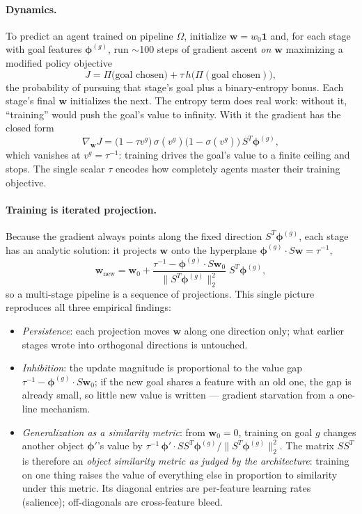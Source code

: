 \documentclass[11pt]{article}
\newcommand{\w}{\bm{w}}
\newcommand{\feat}{\bm{\phi}}
\begin{document}
\paragraph{Dynamics.} To predict an agent trained on pipeline $\Omega$, initialize $\w = w_0 \bm{1}$ and, for each stage with goal features $\feat^{(g)}$, run $\sim$100 steps of gradient ascent \emph{on $\w$} maximizing a modified policy objective
\begin{equation}
J = \Pi\big(\text{goal chosen}\big) + \tau\, h\big(\Pi(\text{goal chosen})\big),
\end{equation}
the probability of pursuing that stage's goal plus a binary-entropy bonus. Each stage's final $\w$ initializes the next. The entropy term does real work: without it, ``training'' would push the goal's value to infinity. With it the gradient has the closed form
\begin{equation}
\nabla_{\w} J = \big(1 - \tau v^g\big)\,\sigma(v^g)\big(1 - \sigma(v^g)\big)\, S^{T}\feat^{(g)},
\end{equation}
which vanishes at $v^g = \tau^{-1}$: training drives the goal's value to a finite ceiling and stops. The single scalar $\tau$ encodes how completely agents master their training objective.

\paragraph{Training is iterated projection.} Because the gradient always points along the fixed direction $S^{T}\feat^{(g)}$, each stage has an analytic solution: it projects $\w$ onto the hyperplane $\feat^{(g)} \cdot S\w = \tau^{-1}$,
\begin{equation}
\w_{\text{new}} = \w_0 + \frac{\tau^{-1} - \feat^{(g)} \cdot S\w_0}{\big\lVert S^{T}\feat^{(g)} \big\rVert_2^2}\; S^{T}\feat^{(g)},
\end{equation}
so a multi-stage pipeline is a sequence of projections. This single picture reproduces all three empirical findings:
\begin{itemize}
\item \emph{Persistence}: each projection moves $\w$ along one direction only; what earlier stages wrote into orthogonal directions is untouched.
\item \emph{Inhibition}: the update magnitude is proportional to the value gap $\tau^{-1} - \feat^{(g)} \cdot S\w_0$; if the new goal shares a feature with an old one, the gap is already small, so little new value is written --- gradient starvation from a one-line mechanism.
\item \emph{Generalization as a similarity metric}: from $\w_0 = 0$, training on goal $g$ changes another object $\feat'$'s value by $\tau^{-1}\,\feat' \cdot SS^{T}\feat^{(g)} / \lVert S^{T}\feat^{(g)}\rVert_2^2$. The matrix $SS^{T}$ is therefore an \emph{object similarity metric as judged by the architecture}: training on one thing raises the value of everything else in proportion to similarity under this metric. Its diagonal entries are per-feature learning rates (salience); off-diagonals are cross-feature bleed.
\end{itemize}
\end{document}
